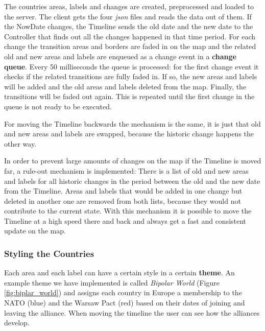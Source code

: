 The countries areas, labels and changes are created, preprocessed and loaded to the server. The client gets the four \textit{json} files and reads the data out of them. If the NowDate changes, the Timeline sends the old date and the new date to the Controller that finds out all the changes happened in that time period. For each change the transition areas and borders are faded in on the map and the related old and new areas and labels are enqueued as a change event in a \textbf{change queue}. Every 50 milliseconds the queue is processed: for the first change event it checks if the related transitions are fully faded in. If so, the new areas and labels will be added and the old areas and labels deleted from the map. Finally, the transitions will be faded out again. This is repeated until the first change in the queue is not ready to be executed.

For moving the Timeline backwards the mechanism is the same, it is just that old and new areas and labels are swapped, because the historic change happens the other way.

In order to prevent large amounts of changes on the map if the Timeline is moved far, a rule-out mechanism is implemented: There is a list of old and new areas and labels for all historic changes in the period between the old and the new date from the Timeline. Areas and labels that would be added in one change but deleted in another one are removed from both lists, because they would not contribute to the current state. With this mechanism it is possible to move the Timeline at a high speed there and back and always get a fast and consistent update on the map.


\subsubsection{Styling the Countries} %
\label{ssub:styling_the_countries}

Each area and each label can have a certain style in a certain \textbf{theme}. An example theme we have implemented is called \textit{Bipolar World} (Figure \ref{fig:biplar_world}) and assigns each country in Europe a membership to the NATO (blue) and the Warsaw Pact (red) based on their dates of joining and leaving the alliance. When moving the timeline the user can see how the alliances develop.

